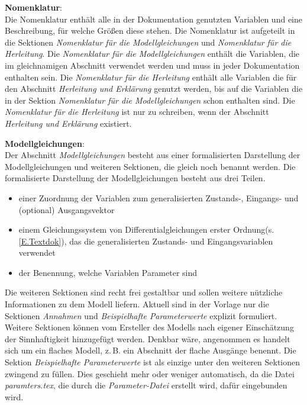 \textbf{Nomenklatur}:\\
Die Nomenklatur enthält alle in der Dokumentation genutzten Variablen und eine Beschreibung, für welche Größen diese stehen. Die Nomenklatur ist aufgeteilt in die Sektionen \textit{Nomenklatur für die Modellgleichungen} und \textit{Nomenklatur für die Herleitung}. Die \textit{Nomenklatur für die Modellgleichungen} enthält die Variablen, die im gleichnamigen Abschnitt verwendet werden und muss in jeder Dokumentation enthalten sein. Die \textit{Nomenklatur für die Herleitung} enthält alle Variablen die für den Abschnitt \textit{Herleitung und Erklärung} genutzt werden, bis auf die Variablen die in der Sektion \textit{Nomenklatur für die Modellgleichungen} schon enthalten sind. Die \textit{Nomenklatur für die Herleitung} ist nur zu schreiben, wenn der Abschnitt \textit{Herleitung und Erklärung} existiert. %

\textbf{Modellgleichungen}:\\
Der Abschnitt \textit{Modellgleichungen} besteht aus einer formalisierten Darstellung der Modellgleichungen und weiteren Sektionen, die gleich noch benannt werden. Die formalisierte Darstellung der Modellgleichungen besteht aus drei Teilen.  
\begin{itemize}[label=$\bullet$]
	\item einer Zuordnung der Variablen zum generalisierten Zustands-, Eingangs- und (optional) Ausgangsvektor
	\item einem Gleichungssystem von Differentialgleichungen erster Ordnung(s. \ref{E.Textdok}), das die generalisierten Zustands- und Eingangsvariablen verwendet
	\item der Benennung, welche Variablen Parameter sind
\end{itemize} %
Die weiteren Sektionen sind recht frei gestaltbar und sollen weitere nützliche Informationen zu dem Modell liefern. Aktuell sind in der Vorlage nur die Sektionen \textit{Annahmen} und \textit{Beispielhafte Parameterwerte} explizit formuliert. Weitere Sektionen können vom Ersteller des Modells nach eigener Einschätzung der Sinnhaftigkeit hinzugefügt werden. Denkbar wäre, angenommen es handelt sich um ein flaches Modell, z.\,B. ein Abschnitt der flache Ausgänge benennt. Die Sektion \textit{Beispielhafte Parameterwerte} ist als einzige unter den weiteren Sektionen zwingend zu füllen. Dies geschieht mehr oder weniger automatisch, da die Datei \textit{paramters.tex}, die durch die \textit{Parameter-Datei} erstellt wird, dafür eingebunden wird.

